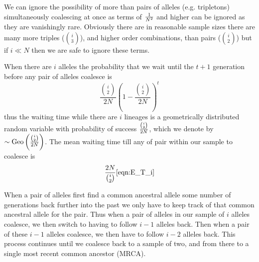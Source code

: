 We can ignore the possibility of more than pairs of alleles (e.g. tripletons)
simultaneously coalescing at once as terms of $\nicefrac{1}{N^2}$ and higher
can be ignored as they are vanishingly rare. Obviously there are in reasonable
sample sizes there are many more triples (${i \choose 3}$), and higher order
combinations, than pairs (${i \choose 2}$) but if $i \ll N$ then we are safe to
ignore these terms.


When there are $i$ alleles the probability that we wait until the
$t+1$ generation before
any pair of alleles coalesce is
\begin{equation}
 \frac{{i \choose
 2}}{2N}\left( 1- \frac{{i \choose
 2}}{2N}\right)^{t} \label{eqn:T_i}
\end{equation}
thus the waiting time while there are $i$ lineages is a geometrically
distributed random variable with probability of success $ \nicefrac{{i \choose
 2}}{2N}$, which we denote by $\sim \text{Geo}
\left(  \nicefrac{{i \choose
 2}}{2N} \right)$.
The mean waiting time till any of pair within our
 sample to coalesce is 
\begin{equation}
\frac{2N}{{i \choose  2}}  \ref{eqn:E_T_i}
\end{equation}

When a pair of alleles first find a common ancestral allele some
number of generations back further into the past we only have to keep
track of that common ancestral allele for the pair. Thus when a pair
of alleles in our sample of $i$ alleles coalesce, we then switch to
having to follow $i-1$ alleles back. Then when a pair of these $i-1$
alleles coalesce, we then have to follow $i-2$ alleles back. This
process continues until we coalesce back to a sample of two, and from
there to a single most recent common ancestor (MRCA).\\


